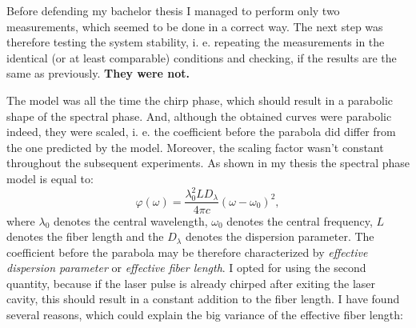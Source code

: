 \documentclass{article}
\begin{document}
Before defending my bachelor thesis I managed to perform only two measurements, which seemed to be done in a correct way. The next step was therefore testing the system stability, i. e. repeating the measurements in the identical (or at least comparable) conditions and checking, if the results are the same as previously. \textbf{They were not.}

The model was all the time the chirp phase, which should result in a parabolic shape of the spectral phase. And, although the obtained curves were parabolic indeed, they were scaled, i. e. the coefficient before the parabola did differ from the one predicted by the model. Moreover, the scaling factor wasn't constant throughout the subsequent experiments. As shown in my thesis the spectral phase model is equal to:
\begin{equation}
\varphi(\omega)=\frac{\lambda_0^2LD_\lambda}{4\pi c}(\omega-\omega_0)^2,
\end{equation}
where $\lambda_0$ denotes the central wavelength, $\omega_0$ denotes the central frequency, $L$ denotes the fiber length and the $D_\lambda$ denotes the dispersion parameter. The coefficient before the parabola may be therefore characterized by \emph{effective dispersion parameter} or \emph{effective fiber length}. I opted for using the second quantity, because if the laser pulse is already chirped after exiting the laser cavity, this should result in a constant addition to the fiber length. I have found several reasons, which could explain the big variance of the effective fiber length:
\end{document}
